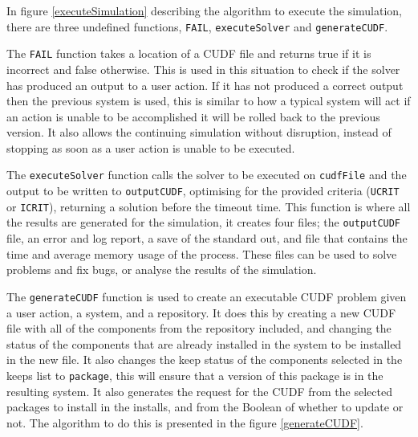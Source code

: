 In figure \ref{executeSimulation} describing the algorithm to execute the simulation, there are three undefined functions, \verb+FAIL+, \verb+executeSolver+ and \verb+generateCUDF+.

The \verb+FAIL+ function takes a location of a CUDF file and returns true if it is incorrect and false otherwise.
This is used in this situation to check if the solver has produced an output to a user action.
If it has not produced a correct output then the previous system is used, 
this is similar to how a typical system will act if an action is unable to be accomplished it will be rolled back to the previous version.
It also allows the continuing simulation without disruption, instead of stopping as soon as a user action is unable to be executed.

The \verb+executeSolver+ function calls the solver to be executed on \verb+cudfFile+ and the output to be written to \verb+outputCUDF+, 
optimising for the provided criteria (\verb+UCRIT+ or \verb+ICRIT+), returning a solution before the timeout time.
This function is where all the results are generated for the simulation, it creates four files;
the \verb+outputCUDF+ file, an error and log report, a save of the standard out, and file that contains the time and average memory usage of the process.
These files can be used to solve problems and fix bugs, or analyse the results of the simulation.

The \verb+generateCUDF+ function is used to create an executable CUDF problem given a user action, a system, and a repository.
It does this by creating a new CUDF file with all of the components from the repository included, 
and changing the status of the components that are already installed in the system to be installed in the new file.
It also changes the keep status of the components selected in the keeps list to \verb+package+, this will ensure that a version of this package is in the resulting system.
It also generates the request for the CUDF from the selected packages to install in the installs, 
and from the Boolean of whether to update or not.
The algorithm to do this is presented in the figure \ref{generateCUDF}.

